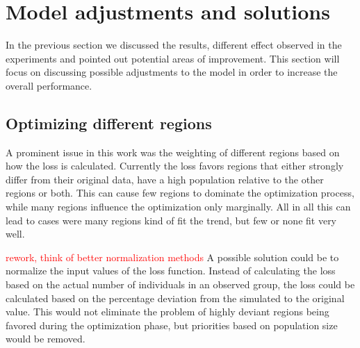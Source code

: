 
\section{Model adjustments and solutions}
In the previous section we discussed the results, different effect observed in the experiments and pointed out potential areas of
improvement. This section will focus on discussing possible adjustments to the model in order to increase the overall performance.


\subsection{Optimizing different regions}
A prominent issue in this work was the weighting of different regions based on how the loss is calculated. Currently the loss
favors regions that either strongly differ from their original data, have a high population relative to the other regions or
both. This can cause few regions to dominate the optimization process, while many regions influence the optimization only marginally.
All in all this can lead to cases were many regions kind of fit the trend, but few or none fit very well. \newline

\textcolor{red}{rework, think of better normalization methods}
A possible solution could be to normalize the input values of the loss function. Instead of calculating the loss based on the actual
number of individuals in an observed group, the loss could be calculated based on the percentage deviation from the simulated
to the original value. This would not eliminate the problem of highly deviant regions being favored during the optimization phase,
but priorities based on population size would be removed. 

